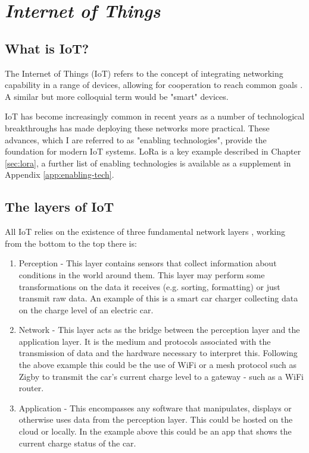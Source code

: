 \section{\emph{Internet of Things}}

\subsection{What is IoT?}

The Internet of Things (IoT) refers to the concept of integrating networking
capability in a range of devices, allowing for cooperation to reach common goals
\cite{atzori2010}. A similar but more colloquial term would be "smart" devices.

IoT has become increasingly common in recent years as a number of technological
breakthroughs has made deploying these networks more practical. These advances,
which I are referred to as "enabling technologies", provide the foundation for
modern IoT systems. LoRa is a key example described in Chapter \ref{sec:lora}, a
further list of enabling technologies is available as a supplement in Appendix
\ref{app:enabling-tech}.

\subsection{The layers of IoT}

All IoT relies on the existence of three fundamental network layers
\cite{burhan2018iot}, working from the bottom to the top there is:

\begin{enumerate}
  \item Perception - This layer contains sensors that collect information about
  conditions in the world around them. This layer may perform some
  transformations on the data it receives (e.g. sorting, formatting) or just
  transmit raw data. An example of this is a smart car charger collecting data
  on the charge level of an electric car.
  \item Network - This layer acts as the bridge between the perception layer and
  the application layer. It is the medium and protocols associated with the
  transmission of data and the hardware necessary to interpret this. Following
  the above example this could be the use of WiFi or a mesh protocol such as
  Zigby to transmit the car's current charge level to a gateway - such as a WiFi
  router.
  \item Application - This encompasses any software that manipulates, displays
  or otherwise uses data from the perception layer. This could be hosted on the
  cloud or locally. In the example above this could be an app that shows the
  current charge status of the car.
\end{enumerate}

